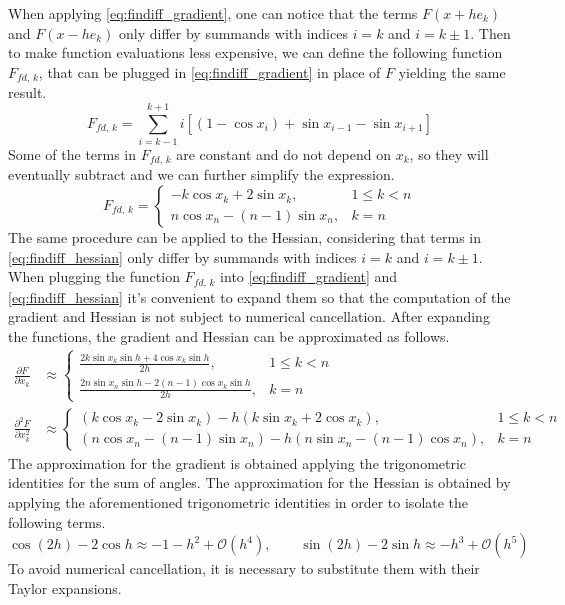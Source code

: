 When applying \ref{eq:findiff_gradient}, one can notice that the terms $F(x + he_k)$ and $F(x - he_k)$ only differ by summands with indices $i = k$ and $i = k \pm 1$.
Then to make function evaluations less expensive, we can define the following function $F_{\textit{fd},\,k}$, that can be plugged in \ref{eq:findiff_gradient} in place of $F$ yielding the same result.
\[
F_{\textit{fd},\,k} = \sum_{i=k-1}^{k+1} i[(1-\cos x_i) + \sin x_{i-1} - \sin x_{i+1}]
\]
Some of the terms in $F_{fd,\,k}$ are constant and do not depend on $x_k$, so they will eventually subtract and we can further simplify the expression.
\[
F_{\textit{fd},\,k} = \left \{ \begin{array}{ll}
    -k\cos x_k + 2\sin x_k, & 1 \leq k < n \\
    n\cos x_n - (n-1)\sin x_n, & k = n
\end{array} \right .
\]
The same procedure can be applied to the Hessian, considering that terms in \ref{eq:findiff_hessian} only differ by summands with indices $i = k$ and $i = k \pm 1$.
When plugging the function $F_{\textit{fd},\,k}$ into \ref{eq:findiff_gradient} and \ref{eq:findiff_hessian} it's convenient to expand them so that the computation of the gradient and Hessian is not subject to numerical cancellation.
After expanding the functions, the gradient and Hessian can be approximated as follows.
\begin{align*}
    \frac{\partial F}{\partial x_k} &\approx \left \{ \begin{array}{ll}
        \frac{2k\sin x_k \sin h + 4\cos x_k \sin h}{2h}, & 1 \leq k < n \\
        \frac{2n\sin x_n \sin h - 2(n-1)\cos x_k \sin h}{2h}, & k = n
    \end{array} \right . \\
    \frac{\partial^2 F}{\partial x_k^2} &\approx \left \{ \begin{array}{ll}
        (k\cos x_k - 2\sin x_k) - h(k\sin x_k + 2\cos x_k), 
        & 1 \leq k < n \\
        (n\cos x_n - (n-1)\sin x_n) - h(n\sin x_n - (n-1)\cos x_n),
        & k = n
    \end{array} \right .
\end{align*}
The approximation for the gradient is obtained applying the trigonometric identities for the sum of angles.
The approximation for the Hessian is obtained by applying the aforementioned trigonometric identities in order to isolate the following terms.
\[
\cos(2h) - 2\cos h \approx -1 - h^2 + \mathcal{O}(h^4),
\qquad
\sin(2h) - 2\sin h \approx -h^3 + \mathcal{O}(h^5)
\]
To avoid numerical cancellation, it is necessary to substitute them with their Taylor expansions.

